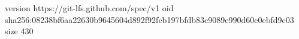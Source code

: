 version https://git-lfs.github.com/spec/v1
oid sha256:08238bf6aa22630b9645604d892f92fcb197bfdb83c9089e990d60c0ebfd9c03
size 430
